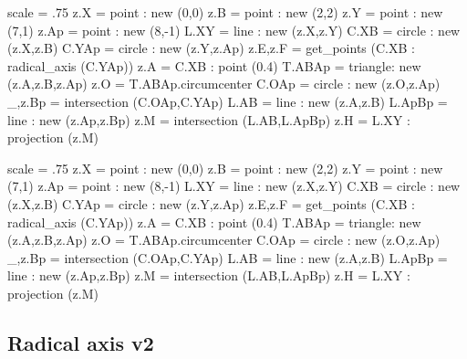 \begin{tkzexample}[latex=0cm,small,code only]
\begin{tkzelements}
scale    = .75
z.X      = point : new (0,0)
z.B      = point : new (2,2)
z.Y      = point : new (7,1)
z.Ap     = point : new (8,-1)
L.XY     = line :    new (z.X,z.Y)
C.XB     = circle : new (z.X,z.B)
C.YAp    = circle : new (z.Y,z.Ap)
z.E,z.F  = get_points (C.XB : radical_axis (C.YAp))
z.A      = C.XB : point (0.4)
T.ABAp   = triangle: new (z.A,z.B,z.Ap)
z.O      = T.ABAp.circumcenter
C.OAp    = circle : new (z.O,z.Ap)
_,z.Bp   = intersection (C.OAp,C.YAp)
L.AB     = line : new (z.A,z.B)
L.ApBp   = line : new (z.Ap,z.Bp)
z.M      = intersection (L.AB,L.ApBp)
z.H      = L.XY : projection (z.M)
\end{tkzelements}
\end{tkzexample}

\begin{tkzelements}
scale    = .75
z.X      = point : new (0,0)
z.B      = point : new (2,2)
z.Y      = point : new (7,1)
z.Ap     = point : new (8,-1)
L.XY     = line :    new (z.X,z.Y)
C.XB     = circle : new (z.X,z.B)
C.YAp    = circle : new (z.Y,z.Ap)
z.E,z.F  = get_points (C.XB : radical_axis (C.YAp))
z.A      = C.XB : point (0.4)
T.ABAp   = triangle: new (z.A,z.B,z.Ap)
z.O      = T.ABAp.circumcenter
C.OAp    = circle : new (z.O,z.Ap)
_,z.Bp   = intersection (C.OAp,C.YAp)
L.AB     = line : new (z.A,z.B)
L.ApBp   = line : new (z.Ap,z.Bp)
z.M      = intersection (L.AB,L.ApBp)
z.H      = L.XY : projection (z.M)
\end{tkzelements}
\hspace*{\fill}

\subsection{Radical axis v2} %
\label{sub:radical_axis_v2}

